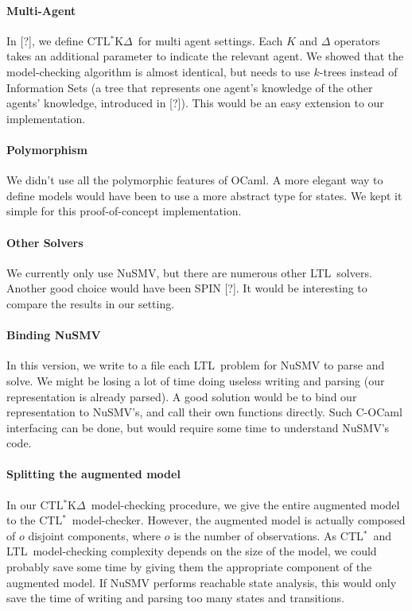 \documentclass[dvipsnames]{acmart}
\def\ctls{CTL$^{*}$}
\def\ctlskd{CTL$^{*}$K$\Delta$}
\def\ltl{LTL}
\def\K{\mathit{K}}
\begin{document}
\paragraph{Multi-Agent}
In [?], we define \ctlskd\ for multi agent settings. Each $\K$ and $\Delta$ operators takes an additional parameter to indicate the relevant agent.
We showed that the model-checking algorithm is almost identical, but needs to use $k$-trees instead of Information Sets (a tree that represents one agent's knowledge of the other agents' knowledge, introduced in [?]).
This would be an easy extension to our implementation.

\paragraph{Polymorphism}
We didn't use all the polymorphic features of OCaml. A more elegant way to define models would have been to use a more abstract type for states. We kept it simple for this proof-of-concept implementation.

\paragraph{Other Solvers}
We currently only use NuSMV, but there are numerous other \ltl\ solvers. Another good choice would have been SPIN [?].
It would be interesting to compare the results in our setting.

\paragraph{Binding NuSMV}
In this version, we write to a file each \ltl\ problem for NuSMV to parse and solve. We might be losing a lot of time doing useless writing and parsing (our representation is already parsed). A good solution would be to bind our representation to NuSMV's, and call their own functions directly. Such C-OCaml interfacing can be done, but would require some time to understand NuSMV's code.

\paragraph{Splitting the augmented model}
In our \ctlskd\ model-checking procedure, we give the entire augmented model to the \ctls\ model-checker.
However, the augmented model is actually composed of $o$ disjoint components, where $o$ is the number of observations.
As \ctls\ and \ltl\ model-checking complexity depends on the size of the model, we could probably save some time by giving them the appropriate component of the augmented model. If NuSMV performs reachable state analysis, this would only save the time of writing and parsing too many states and transitions.
\end{document}
